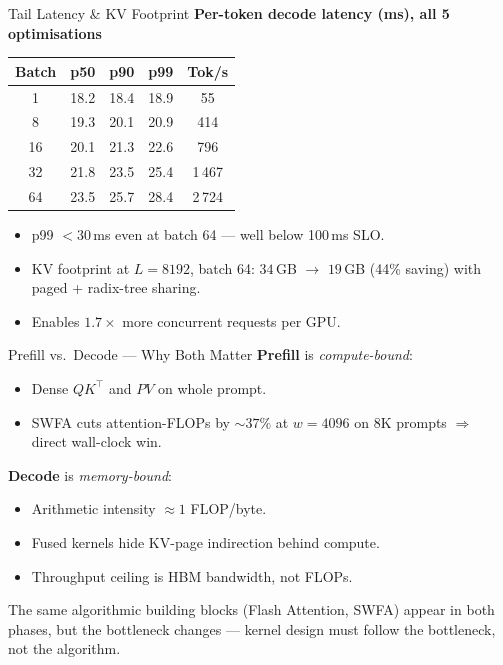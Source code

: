 \documentclass[10pt,aspectratio=169]{beamer}
\begin{document}
\begin{frame}{Tail Latency \& KV Footprint}
  \scriptsize\centering
  \textbf{Per-token decode latency (ms), all 5 optimisations}\\
  \begin{tabular}{@{}ccccc@{}}
    \toprule
    Batch & p50 & p90 & p99 & Tok/s\\
    \midrule
     1 & 18.2 & 18.4 & 18.9 &    55\\
     8 & 19.3 & 20.1 & 20.9 &   414\\
    16 & 20.1 & 21.3 & 22.6 &   796\\
    32 & 21.8 & 23.5 & 25.4 & 1\,467\\
    \alert{64} & \alert{23.5} & \alert{25.7} & \alert{28.4} & \alert{2\,724}\\
    \bottomrule
  \end{tabular}
  \vspace{2ex}

  \normalsize
  \begin{itemize}\footnotesize
    \item p99 $<30$\,ms even at batch 64 — well below 100\,ms SLO.
    \item KV footprint at $L{=}8192$, batch 64: $34$\,GB $\to$ $19$\,GB
          (\alert{44\% saving}) with paged + radix-tree sharing.
    \item Enables $1.7\times$ more concurrent requests per GPU.
  \end{itemize}
\end{frame}

\begin{frame}{Prefill vs.\ Decode — Why Both Matter}
  \textbf{Prefill} is \emph{compute-bound}:
  \begin{itemize}\footnotesize
    \item Dense $QK^\top$ and $PV$ on whole prompt.
    \item SWFA cuts attention-FLOPs by $\sim\!37\%$ at $w{=}4096$ on
          8K prompts $\Rightarrow$ direct wall-clock win.
  \end{itemize}
  \textbf{Decode} is \emph{memory-bound}:
  \begin{itemize}\footnotesize
    \item Arithmetic intensity $\approx 1$ FLOP/byte.
    \item Fused kernels hide KV-page indirection behind compute.
    \item Throughput ceiling is HBM bandwidth, not FLOPs.
  \end{itemize}
  \vspace{1ex}
  \alert{The same algorithmic building blocks (Flash Attention,
         SWFA) appear in both phases, but the bottleneck
         changes} — kernel design must follow the bottleneck, not
  the algorithm.
\end{frame}
\end{document}
